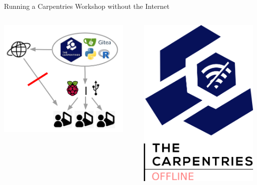 \documentclass{beamer}
\date{September 5, 2023}
\author{JSS \inst{1} \and FT \inst{1} \and CS \inst{2} \\
	\and AD \inst{3} \and EPW \inst{4} \and SF \inst{5}}
\begin{document}
	\begin{frame}
		\begin{columns}
			\begin{column}{\textwidth}
				\begin{block}{ }
				\centering
				Running a Carpentries Workshop without the Internet
				\end{block}
			\end{column}
		\end{columns}
		\begin{columns}
			\begin{column}{.45\textwidth}
				\centering
				\includegraphics[width=.6\columnwidth]{logos/carpentriesoffline_schemaidea.png} \\
			\end{column}
			\begin{column}{.1\textwidth}
			\end{column}
			\begin{column}{.45\textwidth}
				\centering
				\includegraphics[width=.4\columnwidth]{logos/OFFLINE_long.png}
			\end{column}
		\end{columns}
		\begin{columns}
			\begin{column}{\textwidth}
				

\end{column}
\end{columns}
\end{frame}
\end{document}

